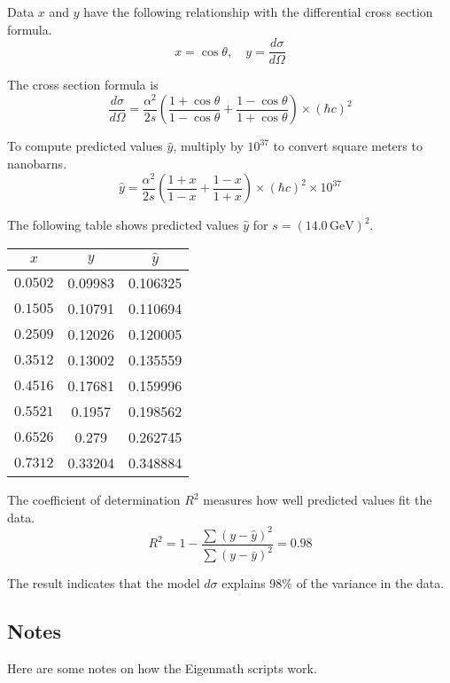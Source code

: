 \documentclass[12pt]{article}
\begin{document}
Data $x$ and $y$ have the following relationship
with the differential cross section formula.
\begin{equation*}
x=\cos\theta,
\quad
y=\frac{d\sigma}{d\Omega}
\end{equation*}

The cross section formula is
\begin{equation*}
\frac{d\sigma}{d\Omega}
=
\frac{\alpha^2}{2s}
\left(
\frac{1+\cos\theta}{1-\cos\theta}+
\frac{1-\cos\theta}{1+\cos\theta}
\right)\times(\hbar c)^2
\end{equation*}

To compute predicted values $\hat{y}$,
multiply by $10^{37}$ to convert square meters to nanobarns.
\begin{equation*}
\hat{y}
=
\frac{\alpha^2}{2s}
\left(
\frac{1+x}{1-x}+
\frac{1-x}{1+x}
\right)
\times(\hbar c)^2
\times10^{37}
\end{equation*}

The following table shows predicted values $\hat{y}$ for $s=(14.0\,\text{GeV})^2$.

\begin{center}
\begin{tabular}{|c|c|c|}
\hline
$x$ & $y$ & $\hat{y}$\\
\hline
$0.0502$ & 0.09983 & 0.106325\\
$0.1505$ & 0.10791 & 0.110694\\
$0.2509$ & 0.12026 & 0.120005\\
$0.3512$ & 0.13002 & 0.135559\\
$0.4516$ & 0.17681 & 0.159996\\
$0.5521$ & 0.1957\phantom{0} & 0.198562\\
$0.6526$ & 0.279\phantom{00} & 0.262745\\
$0.7312$ & 0.33204 & 0.348884\\
\hline
\end{tabular}
\end{center}

The coefficient of determination $R^2$ measures how well predicted values fit the data.
\begin{equation*}
R^2=1-\frac{\sum(y-\hat{y})^2}{\sum(y-\bar{y})^2}=0.98
\end{equation*}

The result indicates that the model $d\sigma$ explains 98\% of the variance in the data.

\subsection*{Notes}
Here are some notes on how the Eigenmath scripts work.
\end{document}
